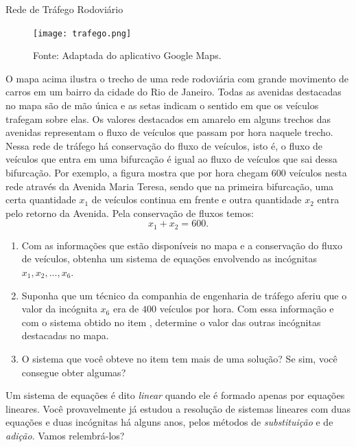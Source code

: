 \begin{task}{Rede de Tráfego Rodoviário}
\label{trafego}

\begin{figure}[H]
\centering

\noindent\texttt{[image: trafego.png]}
\caption{Fonte: Adaptada do aplicativo Google Maps.}
\end{figure}

O mapa acima ilustra o trecho de uma rede rodoviária com grande movimento de carros em um bairro da cidade do Rio de Janeiro. Todas as avenidas destacadas no mapa são de mão única e as setas indicam o sentido em que os veículos trafegam sobre elas. Os valores destacados em amarelo em alguns trechos das avenidas representam o fluxo de veículos que passam por hora naquele trecho. Nessa rede de tráfego há conservação do fluxo de veículos, isto é, o fluxo de veículos que entra em uma bifurcação é igual ao fluxo de veículos que sai dessa bifurcação. Por exemplo, a figura mostra que por hora chegam $600$ veículos nesta rede através da Avenida Maria Teresa, sendo que na primeira bifurcação, uma certa quantidade $x_1$ de veículos continua em frente e outra quantidade $x_2$ entra pelo retorno da Avenida.  Pela conservação de fluxos temos:
$$
x_1 + x_2 = 600.
$$

\begin{enumerate}
\item{}
Com as informações que estão disponíveis no mapa e a conservação do fluxo de veículos, obtenha um sistema de equações envolvendo as incógnitas $x_1,x_2,..., x_6$.

\item{}
Suponha que um técnico da companhia de engenharia de tráfego aferiu que o valor da incógnita $x_6$ era de $400$ veículos por hora. Com essa informação e com o sistema obtido no item , determine o valor das outras incógnitas destacadas no mapa. 

\item{}
O sistema que você obteve no item  tem mais de uma solução? Se sim, você consegue obter algumas?

\end{enumerate}

\end{task}




\label{\detokenize{AF107-5:sistemas-lineares}}\label{\detokenize{AF107-5::doc}}


Um sistema de equações é dito \emph{linear} quando ele é formado apenas por equações lineares. Você provavelmente já estudou a resolução de sistemas lineares com duas equações e duas incógnitas há alguns anos, pelos métodos de \emph{substituição} e de \emph{adição}. Vamos relembrá-los?


